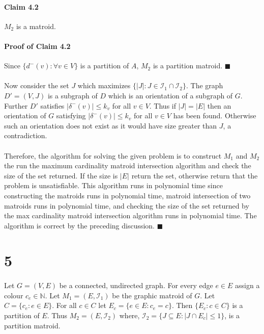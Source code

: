 \documentclass[letterpaper,12pt,oneside,onecolumn]{report}
\begin{document}
\paragraph{Claim 4.2}
$M_2$ is a matroid.
\paragraph{Proof of Claim 4.2}
Since $\{d^-(v) : \forall v \in V\}$ is a partition of $A$, $M_2$ is a partition matroid. $\blacksquare$
\paragraph{}
Now consider the set $J$ which maximizes $\{|J| : J \in \mathcal{I}_1 \cap \mathcal{I}_2 \}$. The graph $D' = (V, J)$ is a subgraph of $D$ which is an orientation of a subgraph of $G$. Further $D'$ satisfies $|\delta^-(v)| \leq k_v$ for all $v\in V$. Thus if $|J| = |E|$ then an orientation of $G$ satisfying $|\delta^-(v)| \leq k_v$ for all $v\in V$ has been found. Otherwise such an orientation does not exist as it would have size greater than $J$, a contradiction.
\paragraph{}
Therefore, the algorithm for solving the given problem is to construct $M_1$ and $M_2$ the run the maximum cardinality matroid intersection algorithm and check the size of the set returned. If the size is $|E|$ return the set, otherwise return that the problem is unsatisfiable. This algorithm runs in polynomial time since constructing the matroids runs in polynomial time, matroid intersection of two matroids runs in polynomial time, and checking the size of the set returned by the max cardinality matroid intersection algorithm runs in polynomial time. The algorithm is correct by the preceding discussion. $\blacksquare$
\section*{5}
\paragraph{}
Let $G=(V,E)$ be a connected, undirected graph. For every edge $e \in E$ assign a colour $c_e \in \mathbb{N}$. Let $M_1=(E,\mathcal{I}_1)$ be the graphic matroid of $G$. Let $C = \{c_e : e\in E\}$. For all $c \in C$ let $E_c = \{e \in E : c_e = c\}$. Then $\{E_c : c \in C\}$ is a partition of $E$. Thus $M_2=(E, \mathcal{I}_2)$ where, $\mathcal{I}_2 = \{J \subseteq E : |J \cap E_c| \leq 1\}$, is a partition matroid.
\end{document}
